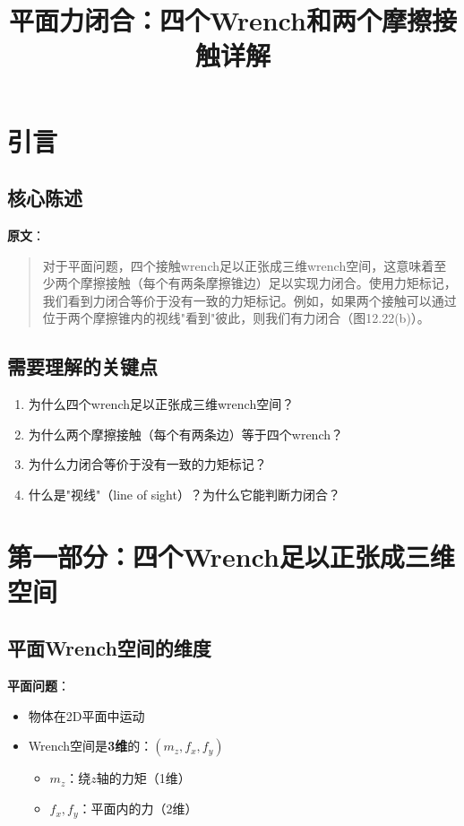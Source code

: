 \documentclass[12pt,a4paper]{article}
\title{平面力闭合：四个Wrench和两个摩擦接触详解}
\author{}
\date{}
\begin{document}
\maketitle

\section{引言}

\subsection{核心陈述}

\textbf{原文}：
\begin{quote}
对于平面问题，四个接触wrench足以正张成三维wrench空间，这意味着至少两个摩擦接触（每个有两条摩擦锥边）足以实现力闭合。使用力矩标记，我们看到力闭合等价于没有一致的力矩标记。例如，如果两个接触可以通过位于两个摩擦锥内的视线"看到"彼此，则我们有力闭合（图12.22(b)）。
\end{quote}

\subsection{需要理解的关键点}

\begin{enumerate}
\item 为什么四个wrench足以正张成三维wrench空间？
\item 为什么两个摩擦接触（每个有两条边）等于四个wrench？
\item 为什么力闭合等价于没有一致的力矩标记？
\item 什么是"视线"（line of sight）？为什么它能判断力闭合？
\end{enumerate}

\section{第一部分：四个Wrench足以正张成三维空间}

\subsection{平面Wrench空间的维度}

\textbf{平面问题}：
\begin{itemize}
\item 物体在2D平面中运动
\item Wrench空间是\textbf{3维}的：$(m_z, f_x, f_y)$
   \begin{itemize}
   \item $m_z$：绕$z$轴的力矩（1维）
   \item $f_x, f_y$：平面内的力（2维）
   \end{itemize}
\end{itemize}
\end{document}
